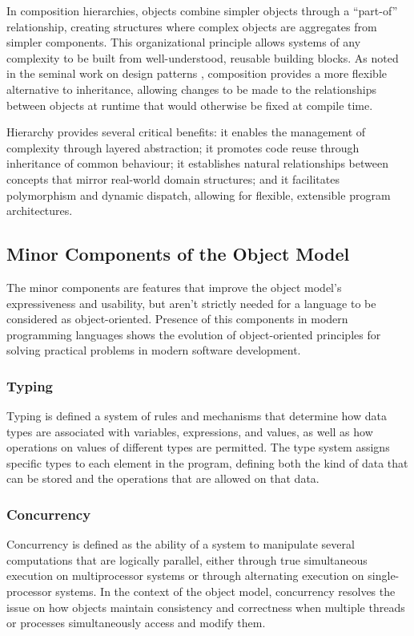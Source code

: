 In composition hierarchies, objects combine simpler objects through a “part-of” relationship, creating structures where complex objects are aggregates from simpler components. This organizational principle allows systems of any complexity to be built from well-understood, reusable building blocks. As noted in the seminal work on design patterns \cite{gamma1995design}, composition provides a more flexible alternative to inheritance, allowing changes to be made to the relationships between objects at runtime that would otherwise be fixed at compile time.

Hierarchy provides several critical benefits: it enables the management of complexity through layered abstraction; it promotes code reuse through inheritance of common behaviour; it establishes natural relationships between concepts that mirror real-world domain structures; and it facilitates polymorphism and dynamic dispatch, allowing for flexible, extensible program architectures.

\subsection{Minor Components of the Object Model}

The minor components are features that improve the object model's expressiveness and usability, but aren't strictly needed for a language to be considered as object-oriented. Presence of this components in modern programming languages shows the evolution of object-oriented principles for solving practical problems in modern software development.

\subsubsection{Typing}

Typing is defined a system of rules and mechanisms that determine how data types are associated with variables, expressions, and values, as well as how operations on values of different types are permitted. The type system assigns specific types to each element in the program, defining both the kind of data that can be stored and the operations that are allowed on that data.

\subsubsection{Concurrency}

Concurrency is defined as the ability of a system to manipulate several computations that are logically parallel, either through true simultaneous execution on multiprocessor systems or through alternating execution on single-processor systems. In the context of the object model, concurrency resolves the issue on how objects maintain consistency and correctness when multiple threads or processes simultaneously access and modify them.

